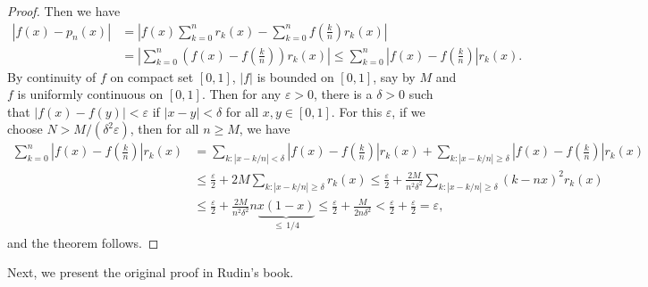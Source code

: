 \documentclass[11pt]{book}
\theoremstyle{definition}
\numberwithin{equation}{chapter}
\begin{document}
\begin{proof}
Then we have
\begin{align*}
    \left|f(x) - p_n(x)\right| & = \left|f(x) \sum^n_{k=0} r_k(x) - \sum^n_{k=0} f\left(\frac{k}{n}\right) r_k(x)\right| \\
    & = \left|\sum^n_{k=0} \left(f(x) - f\left(\frac{k}{n}\right)\right) r_k(x)\right| \leq \sum^n_{k=0} \left|f(x) - f\left(\frac{k}{n}\right)\right| r_k(x).
\end{align*}
By continuity of $f$ on compact set $[0,1]$, $\left|f\right|$ is bounded on $[0,1]$, say by $M$ and $f$ is uniformly continuous on $[0,1]$. Then for any $\varepsilon > 0$, there is a $\delta > 0$ such that $\left|f(x) - f(y)\right| < \varepsilon$ if $\left|x - y\right| < \delta$ for all $x,y \in [0,1]$. For this $\varepsilon$, if we choose $N > M/(\delta^2 \varepsilon)$, then for all $n \geq M$, we have
\begin{align*}
    \sum^n_{k=0} \left|f(x) - f\left(\frac{k}{n}\right)\right| r_k(x) & = \sum_{k:\left|x-k/n\right|<\delta} \left|f(x) - f\left(\frac{k}{n}\right)\right| r_k(x) + \sum_{k:\left|x-k/n\right|\geq \delta} \left|f(x) - f\left(\frac{k}{n}\right)\right| r_k(x) \\
    & \leq \frac{\varepsilon}{2} + 2M \sum_{k:\left|x-k/n\right|\geq \delta} r_k(x) 
    \leq \frac{\varepsilon}{2} + \frac{2M}{n^2\delta^2} \sum_{k:\left|x-k/n\right|\geq \delta} (k - nx)^2 r_k(x) \\
    & \leq \frac{\varepsilon}{2} + \frac{2M}{n^2\delta^2} n \underbrace{x(1 - x)}_{\leq\, 1/4} \leq \frac{\varepsilon}{2} + \frac{M}{2n\delta^2} < \frac{\varepsilon}{2} + \frac{\varepsilon}{2} = \varepsilon,
\end{align*}
and the theorem follows.
\end{proof}

\medskip

Next, we present the original proof in Rudin's book.

\medskip
\end{document}

